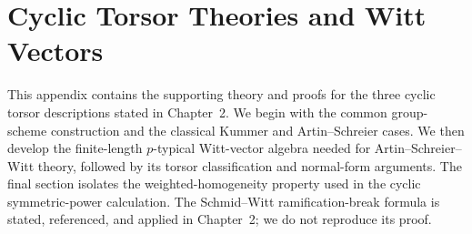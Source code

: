 \chapter{Cyclic Torsor Theories and Witt Vectors}
\label{appendix:witt_vector_algebra}
\label{appendix:cyclic_torsor_theories}

This appendix contains the supporting theory and proofs for the three cyclic
torsor descriptions stated in Chapter~2. We begin with the common
group-scheme construction and the classical Kummer and Artin--Schreier cases.
We then develop the finite-length \(p\)-typical Witt-vector algebra needed for
Artin--Schreier--Witt theory, followed by its torsor classification and
normal-form arguments. The final section isolates the weighted-homogeneity
property used in the cyclic symmetric-power calculation. The Schmid--Witt
ramification-break formula is stated, referenced, and applied in Chapter~2;
we do not reproduce its proof.

\providecommand{\bW}{\mathbb{W}}











